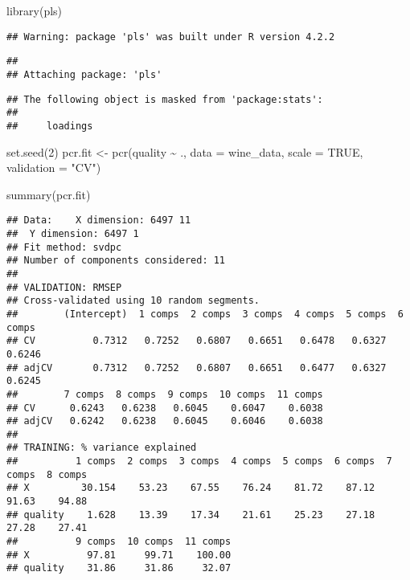 \documentclass[
]{article}
\newenvironment{Shaded}{\begin{snugshade}}{\end{snugshade}}
\newcommand{\AttributeTok}[1]{\textcolor[rgb]{0.77,0.63,0.00}{#1}}
\newcommand{\ConstantTok}[1]{\textcolor[rgb]{0.00,0.00,0.00}{#1}}
\newcommand{\DecValTok}[1]{\textcolor[rgb]{0.00,0.00,0.81}{#1}}
\newcommand{\FunctionTok}[1]{\textcolor[rgb]{0.00,0.00,0.00}{#1}}
\newcommand{\NormalTok}[1]{#1}
\newcommand{\OtherTok}[1]{\textcolor[rgb]{0.56,0.35,0.01}{#1}}
\newcommand{\SpecialCharTok}[1]{\textcolor[rgb]{0.00,0.00,0.00}{#1}}
\newcommand{\StringTok}[1]{\textcolor[rgb]{0.31,0.60,0.02}{#1}}
\begin{document}
\begin{Shaded}
\begin{Highlighting}[]
\FunctionTok{library}\NormalTok{(pls)}
\end{Highlighting}
\end{Shaded}

\begin{verbatim}
## Warning: package 'pls' was built under R version 4.2.2
\end{verbatim}

\begin{verbatim}
## 
## Attaching package: 'pls'
\end{verbatim}

\begin{verbatim}
## The following object is masked from 'package:stats':
## 
##     loadings
\end{verbatim}

\begin{Shaded}
\begin{Highlighting}[]
\FunctionTok{set.seed}\NormalTok{(}\DecValTok{2}\NormalTok{)}
\NormalTok{pcr.fit }\OtherTok{\textless{}{-}} \FunctionTok{pcr}\NormalTok{(quality }\SpecialCharTok{\textasciitilde{}}\NormalTok{ ., }\AttributeTok{data =}\NormalTok{ wine\_data, }\AttributeTok{scale =} \ConstantTok{TRUE}\NormalTok{, }\AttributeTok{validation =} \StringTok{"CV"}\NormalTok{)}
\end{Highlighting}
\end{Shaded}

\begin{Shaded}
\begin{Highlighting}[]
\FunctionTok{summary}\NormalTok{(pcr.fit)}
\end{Highlighting}
\end{Shaded}

\begin{verbatim}
## Data:    X dimension: 6497 11 
##  Y dimension: 6497 1
## Fit method: svdpc
## Number of components considered: 11
## 
## VALIDATION: RMSEP
## Cross-validated using 10 random segments.
##        (Intercept)  1 comps  2 comps  3 comps  4 comps  5 comps  6 comps
## CV          0.7312   0.7252   0.6807   0.6651   0.6478   0.6327   0.6246
## adjCV       0.7312   0.7252   0.6807   0.6651   0.6477   0.6327   0.6245
##        7 comps  8 comps  9 comps  10 comps  11 comps
## CV      0.6243   0.6238   0.6045    0.6047    0.6038
## adjCV   0.6242   0.6238   0.6045    0.6046    0.6038
## 
## TRAINING: % variance explained
##          1 comps  2 comps  3 comps  4 comps  5 comps  6 comps  7 comps  8 comps
## X         30.154    53.23    67.55    76.24    81.72    87.12    91.63    94.88
## quality    1.628    13.39    17.34    21.61    25.23    27.18    27.28    27.41
##          9 comps  10 comps  11 comps
## X          97.81     99.71    100.00
## quality    31.86     31.86     32.07
\end{verbatim}
\end{document}
